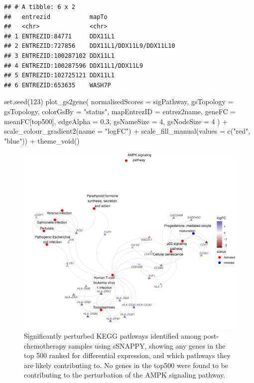 \documentclass[9pt,a4paper,]{extarticle}
\newenvironment{Shaded}{\begin{snugshade}}{\end{snugshade}}
\newcommand{\AttributeTok}[1]{\textcolor[rgb]{0.77,0.63,0.00}{#1}}
\newcommand{\DecValTok}[1]{\textcolor[rgb]{0.00,0.00,0.81}{#1}}
\newcommand{\FloatTok}[1]{\textcolor[rgb]{0.00,0.00,0.81}{#1}}
\newcommand{\FunctionTok}[1]{\textcolor[rgb]{0.00,0.00,0.00}{#1}}
\newcommand{\NormalTok}[1]{#1}
\newcommand{\SpecialCharTok}[1]{\textcolor[rgb]{0.00,0.00,0.00}{#1}}
\newcommand{\StringTok}[1]{\textcolor[rgb]{0.31,0.60,0.02}{#1}}
\begin{document}
\begin{verbatim}
## # A tibble: 6 x 2
##   entrezid           mapTo                   
##   <chr>              <chr>                   
## 1 ENTREZID:84771     DDX11L1                 
## 2 ENTREZID:727856    DDX11L1/DDX11L9/DDX11L10
## 3 ENTREZID:100287102 DDX11L1                 
## 4 ENTREZID:100287596 DDX11L1/DDX11L9         
## 5 ENTREZID:102725121 DDX11L1                 
## 6 ENTREZID:653635    WASH7P
\end{verbatim}

\begin{Shaded}
\begin{Highlighting}[]
\FunctionTok{set.seed}\NormalTok{(}\DecValTok{123}\NormalTok{)}
\FunctionTok{plot\_gs2gene}\NormalTok{(}
  \AttributeTok{normalisedScores =}\NormalTok{ sigPathway, }
  \AttributeTok{gsTopology =}\NormalTok{ gsTopology, }
  \AttributeTok{colorGsBy =} \StringTok{"status"}\NormalTok{, }
  \AttributeTok{mapEntrezID =}\NormalTok{ entrez2name, }
  \AttributeTok{geneFC =}\NormalTok{ meanFC[top500], }
  \AttributeTok{edgeAlpha =} \FloatTok{0.3}\NormalTok{, }
  \AttributeTok{gsNameSize =} \DecValTok{4}\NormalTok{, }\AttributeTok{gsNodeSize =} \DecValTok{4}
\NormalTok{) }\SpecialCharTok{+}
  \FunctionTok{scale\_colour\_gradient2}\NormalTok{(}\AttributeTok{name =} \StringTok{"logFC"}\NormalTok{) }\SpecialCharTok{+}
  \FunctionTok{scale\_fill\_manual}\NormalTok{(}\AttributeTok{values =} \FunctionTok{c}\NormalTok{(}\StringTok{"red"}\NormalTok{, }\StringTok{"blue"}\NormalTok{)) }\SpecialCharTok{+}
  \FunctionTok{theme\_void}\NormalTok{()}
\end{Highlighting}
\end{Shaded}

\begin{figure}

{\centering \includegraphics[width=0.8\linewidth]{sSNAPPY_paper_files/figure-latex/Figure4-1} 

}

\caption{Significantly perturbed KEGG pathways identified among post-chemotherapy samples using sSNAPPY, showing any genes in the top 500 ranked for differential expression, and which pathways they are likely contributing to. No genes in the top500 were found to be contributing to the perturbation of the AMPK signaling pathway.}\label{fig:Figure4}
\end{figure}
\end{document}
